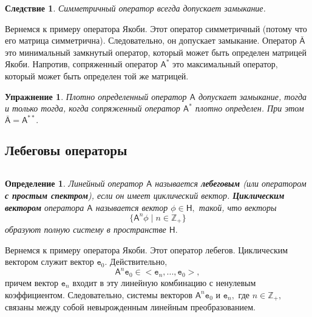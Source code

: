 \documentclass[12 pt, a4 paper]{article}
\theoremstyle{plain}   \newtheorem{Pro}{Задача}
\newtheorem{Def}{Определение}
\newtheorem{Cor}{Следствие}
\newtheorem{Exe}{Упражнение}
\begin{document}
\begin{Cor}
Симметричный оператор всегда допускает замыкание.
\end{Cor}
Вернемся к примеру оператора Якоби. Этот оператор симметричный
(потому что его матрица симметрична). Следовательно, он допускает
замыкание. Оператор
$ \bar{\mathsf{A}}$
это минимальный замкнутый оператор, который может быть определен
матрицей Якоби. Напротив, сопряженный оператор
$ \mathsf{A}^{\ast} $
это максимальный оператор, который может быть определен
той же матрицей.
\begin{Exe}
Плотно определенный оператор
$ \mathsf{A} $
допускает замыкание, тогда и только тогда, когда сопряженный
оператор
$ \mathsf{A}^{\ast} $
плотно определен. При этом
$ \bar{\mathsf{A}}=\mathsf{A}^{\ast \ast} . $
\end{Exe}
\newpage
\subsection{Лебеговы операторы}
$ \; $
\\
\begin{Def}
Линейный оператор
$ \mathsf{A} $
называется
{\bfseries лебеговым} (или оператором
{\bfseries с простым спектром}),
если он имеет циклический вектор.
{\bfseries Циклическим вектором} оператора
$ \mathsf{A} $
называется вектор
$ \phi \in \mathsf{H} , $
такой, что векторы
$$
  \{ \mathsf{A}^n \phi \; | \; n \in \mathbb{Z}_+ \}
$$
образуют полную систему в пространстве
$ \mathsf{H} . $
\end{Def}
Вернемся к примеру оператора Якоби.
Этот оператор лебегов. Циклическим вектором служит вектор
$ \mathtt{e}_0 . $
Действительно,
$$
  \mathsf{A}^n \mathtt{e}_0 \in
  <\mathtt{e}_n ,...,\mathtt{e}_0 >,
$$
причем вектор
$ \mathtt{e}_n $
входит в эту линейную комбинацию с ненулевым коэффициентом.
Следовательно, системы векторов
$ \mathsf{A}^n \mathtt{e}_0 $
и
$ \mathtt{e}_n , $
где
$ n \in \mathbb{Z}_+ , $
связаны между собой невырожденным линейным преобразованием.
\\
\end{document}
